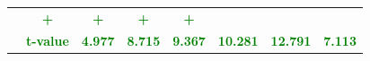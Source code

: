 \documentclass[11pt,english,a4paper,hidelinks]{book}
\begin{document}
\begin{table}[H]
\begin{tabular}{lccccccc}
                     & \textbf{\textcolor{green}{+}}
                     & \textbf{\textcolor{green}{+}}
                     & \textbf{\textcolor{green}{+}}
                     & \textbf{\textcolor{green}{+}} \\
            & \textbf{\textcolor{green}{t-value}}
                     & \textbf{\textcolor{green}{4.977}}
                     & \textbf{\textcolor{green}{8.715}}
                     & \textbf{\textcolor{green}{9.367}}
                     & \textbf{\textcolor{green}{10.281}}
                     & \textbf{\textcolor{green}{12.791}}
                     & \textbf{\textcolor{green}{7.113}} \\
        \bottomrule
    \end{tabular}
    \label{tab:europe_growth_consistency}
\end{table}
\end{document}
